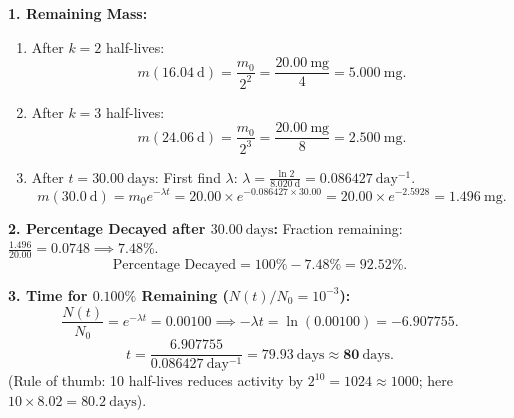 \begin{solution}
\textbf{1. Remaining Mass:}
\begin{enumerate}[leftmargin=1.4em,itemsep=2pt]
  \item After $k = 2$ half-lives:
  \[
  m(16.04\ \mathrm{d}) = \frac{m_0}{2^2} = \frac{20.00\ \mathrm{mg}}{4} = \mathbf{5.000\ \mathrm{mg}}.
  \]
  \item After $k = 3$ half-lives:
  \[
  m(24.06\ \mathrm{d}) = \frac{m_0}{2^3} = \frac{20.00\ \mathrm{mg}}{8} = \mathbf{2.500\ \mathrm{mg}}.
  \]
  \item After $t = 30.00\ \mathrm{days}$:
  First find $\lambda$: $\lambda = \frac{\ln 2}{8.020\ \mathrm{d}} = 0.086427\ \mathrm{day^{-1}}$.
  \[
  m(30.0\ \mathrm{d}) = m_0 e^{-\lambda t} = 20.00 \times e^{-0.086427 \times 30.00} = 20.00 \times e^{-2.5928} = \mathbf{1.496\ \mathrm{mg}}.
  \]
\end{enumerate}

\textbf{2. Percentage Decayed after $30.00\ \mathrm{days}$:}
Fraction remaining: $\frac{1.496}{20.00} = 0.0748 \implies 7.48\%$.
\[
\text{Percentage Decayed} = 100\% - 7.48\% = \mathbf{92.52\%}.
\]

\textbf{3. Time for $0.100\%$ Remaining ($N(t)/N_0 = 10^{-3}$):}
\[
\frac{N(t)}{N_0} = e^{-\lambda t} = 0.00100 \implies -\lambda t = \ln(0.00100) = -6.907755.
\]
\[
t = \frac{6.907755}{0.086427\ \mathrm{day^{-1}}} = \mathbf{79.93\ \mathrm{days}} \approx \mathbf{80\ \mathrm{days}}.
\]
(Rule of thumb: 10 half-lives reduces activity by $2^{10} = 1024 \approx 1000$; here $10 \times 8.02 = 80.2\ \mathrm{days}$).
\end{solution}

